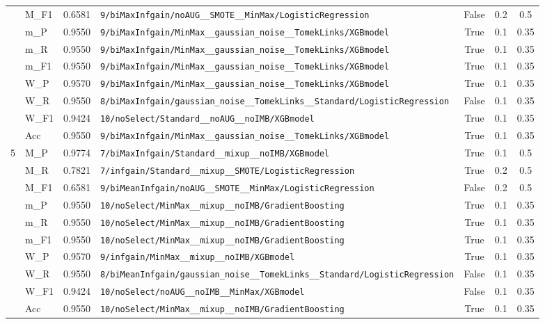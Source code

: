 \begin{table}[htbp]
\begin{tabular}{|c|l|c|>{\ttfamily\footnotesize}p{7.2cm}|c|c|c|}
 & M\_F1 & 0.6581 & \texttt{9/biMaxInfgain/noAUG\_\_SMOTE\_\_MinMax/LogisticRegression} & False & 0.2 & 0.5 \\
 & m\_P & 0.9550 & \texttt{9/biMaxInfgain/MinMax\_\_gaussian\_noise\_\_TomekLinks/XGBmodel} & True & 0.1 & 0.35 \\
 & m\_R & 0.9550 & \texttt{9/biMaxInfgain/MinMax\_\_gaussian\_noise\_\_TomekLinks/XGBmodel} & True & 0.1 & 0.35 \\
 & m\_F1 & 0.9550 & \texttt{9/biMaxInfgain/MinMax\_\_gaussian\_noise\_\_TomekLinks/XGBmodel} & True & 0.1 & 0.35 \\
 & W\_P & 0.9570 & \texttt{9/biMaxInfgain/MinMax\_\_gaussian\_noise\_\_TomekLinks/XGBmodel} & True & 0.1 & 0.35 \\
 & W\_R & 0.9550 & \texttt{8/biMaxInfgain/gaussian\_noise\_\_TomekLinks\_\_Standard/LogisticRegression} & False & 0.1 & 0.35 \\
 & W\_F1 & 0.9424 & \texttt{10/noSelect/Standard\_\_noAUG\_\_noIMB/XGBmodel} & True & 0.1 & 0.35 \\
 & Acc & 0.9550 & \texttt{9/biMaxInfgain/MinMax\_\_gaussian\_noise\_\_TomekLinks/XGBmodel} & True & 0.1 & 0.35 \\
\hline
\multirow{10}{*}{5} & M\_P & 0.9774 & \texttt{7/biMaxInfgain/Standard\_\_mixup\_\_noIMB/XGBmodel} & True & 0.1 & 0.5 \\
 & M\_R & 0.7821 & \texttt{7/infgain/Standard\_\_mixup\_\_SMOTE/LogisticRegression} & True & 0.2 & 0.5 \\
 & M\_F1 & 0.6581 & \texttt{9/biMeanInfgain/noAUG\_\_SMOTE\_\_MinMax/LogisticRegression} & False & 0.2 & 0.5 \\
 & m\_P & 0.9550 & \texttt{10/noSelect/MinMax\_\_mixup\_\_noIMB/GradientBoosting} & True & 0.1 & 0.35 \\
 & m\_R & 0.9550 & \texttt{10/noSelect/MinMax\_\_mixup\_\_noIMB/GradientBoosting} & True & 0.1 & 0.35 \\
 & m\_F1 & 0.9550 & \texttt{10/noSelect/MinMax\_\_mixup\_\_noIMB/GradientBoosting} & True & 0.1 & 0.35 \\
 & W\_P & 0.9570 & \texttt{9/infgain/MinMax\_\_mixup\_\_noIMB/XGBmodel} & True & 0.1 & 0.35 \\
 & W\_R & 0.9550 & \texttt{8/biMeanInfgain/gaussian\_noise\_\_TomekLinks\_\_Standard/LogisticRegression} & False & 0.1 & 0.35 \\
 & W\_F1 & 0.9424 & \texttt{10/noSelect/noAUG\_\_noIMB\_\_MinMax/XGBmodel} & False & 0.1 & 0.35 \\
 & Acc & 0.9550 & \texttt{10/noSelect/MinMax\_\_mixup\_\_noIMB/GradientBoosting} & True & 0.1 & 0.35 \\
\hline
\end{tabular}
\end{table}